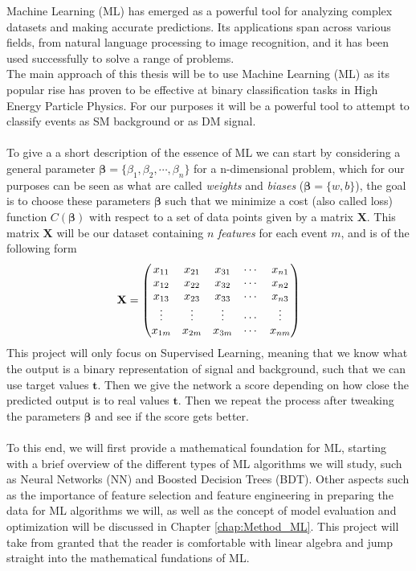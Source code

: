 \documentclass[14pt, a4paper]{book}
\begin{document}
Machine Learning (ML) has emerged as a powerful tool for analyzing complex datasets and making accurate predictions. Its applications span across various fields, from natural language processing to image recognition, and it has been used successfully to solve a range of problems. \\
The main approach of this thesis will be to use Machine Learning (ML) as its popular rise has proven to be effective at binary classification tasks \cite{Baldi_2016, DeepLearing} in High Energy Particle Physics. 
For our purposes it will be a powerful tool to attempt to classify events as SM background or as DM signal. 
\\
\\To give a a short description of the essence of ML we can start by considering a general parameter $\bm{\beta} = \{\beta_1,\beta_2,\cdots,\beta_n\}$ for a n-dimensional problem, which for our purposes can be seen as what are called \textit{weights} and \textit{biases} 
($\bm \beta = \{w, b\}$), 
the goal is to choose these parameters $\bm{\beta}$ such that we minimize a cost (also called loss) function $C(\bm{\beta})$ with respect to a set of data points given by a matrix $\mathbf{X}$. This matrix $\mathbf{X}$ will be 
our dataset containing $n$ \textit{features} for each event $m$, and is of the following form 
\begin{equation}\label{eq:dataset}
    \bf X = \begin{pmatrix}
        x_{11} & x_{21} & x_{31} & \cdots & x_{n1}\\
        x_{12} & x_{22} & x_{32} & \cdots & x_{n2}\\
        x_{13} & x_{23} & x_{33} & \cdots & x_{n3}\\
        \vdots & \vdots & \vdots & \cdots & \vdots\\
        x_{1m} & x_{2m} & x_{3m} & \cdots & x_{nm}\\  
    \end{pmatrix}    
\end{equation}
This project will only focus on Supervised Learning, meaning that we know what the output is a binary representation of signal and background, such that we can use target values $\bm{t}$. 
Then we give the network a score depending on how close the predicted output is to real values $\bm t $. Then we repeat the process after tweaking the parameters $\bm \beta $ and see if the score gets better.\\
\\To this end, we will first provide a mathematical foundation for ML, starting with a brief overview of the different types of ML algorithms we will study, such as Neural Networks (NN) and Boosted Decision Trees (BDT). 
Other aspects such as the importance of feature selection and feature engineering in preparing the data for ML algorithms we will, as well as the concept of model evaluation and optimization will be discussed in Chapter \ref{chap:Method_ML}. 
This project will take from granted that the reader is comfortable with linear algebra and jump straight into the mathematical fundations of ML. \\
\end{document}
